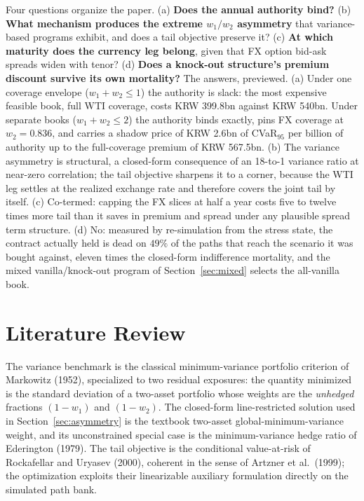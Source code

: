 \documentclass[11pt,a4paper]{article}
\begin{document}
Four questions organize the paper. (a) \textbf{Does the annual authority bind?} (b) \textbf{What mechanism produces the extreme $w_1/w_2$ asymmetry} that variance-based programs exhibit, and does a tail objective preserve it? (c) \textbf{At which maturity does the currency leg belong}, given that FX option bid-ask spreads widen with tenor? (d) \textbf{Does a knock-out structure's premium discount survive its own mortality?} The answers, previewed. (a) Under one coverage envelope ($w_1+w_2\le1$) the authority is slack: the most expensive feasible book, full WTI coverage, costs KRW 399.8bn against KRW 540bn. Under separate books ($w_1+w_2\le2$) the authority binds exactly, pins FX coverage at $w_2=0.836$, and carries a shadow price of KRW 2.6bn of CVaR$_{95}$ per billion of authority up to the full-coverage premium of KRW 567.5bn. (b) The variance asymmetry is structural, a closed-form consequence of an 18-to-1 variance ratio at near-zero correlation; the tail objective sharpens it to a corner, because the WTI leg settles at the realized exchange rate and therefore covers the joint tail by itself. (c) Co-termed: capping the FX slices at half a year costs five to twelve times more tail than it saves in premium and spread under any plausible spread term structure. (d) No: measured by re-simulation from the stress state, the contract actually held is dead on $49\%$ of the paths that reach the scenario it was bought against, eleven times the closed-form indifference mortality, and the mixed vanilla/knock-out program of Section~\ref{sec:mixed} selects the all-vanilla book.

\section{Literature Review}

The variance benchmark is the classical minimum-variance portfolio criterion of Markowitz (1952), specialized to two residual exposures: the quantity minimized is the standard deviation of a two-asset portfolio whose weights are the \emph{unhedged} fractions $(1-w_1)$ and $(1-w_2)$. The closed-form line-restricted solution used in Section~\ref{sec:asymmetry} is the textbook two-asset global-minimum-variance weight, and its unconstrained special case is the minimum-variance hedge ratio of Ederington (1979). The tail objective is the conditional value-at-risk of Rockafellar and Uryasev (2000), coherent in the sense of Artzner et al.\ (1999); the optimization exploits their linearizable auxiliary formulation directly on the simulated path bank.
\end{document}
